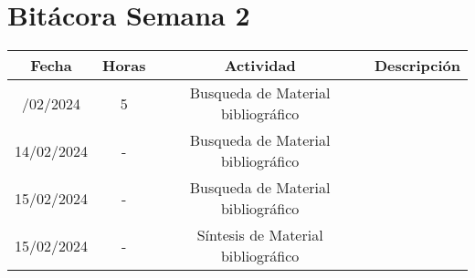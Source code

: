 \documentclass{article}
\begin{document}
\newpage
\section*{Bitácora Semana 2}

\begin{longtable}[c]{|c|c|c|p{6cm}|}
    \hline
    \textbf{Fecha} & \textbf{Horas} & \textbf{Actividad} & \textbf{Descripción} \\
    \hline
    \endhead
    \hline
    \endfoot
    13/02/2024 & 5 & Busqueda de Material bibliográfico &  \\
    14/02/2024 & - & Busqueda de Material bibliográfico & \\
    15/02/2024 & - & Busqueda de Material bibliográfico &  \\
    15/02/2024 & - & Síntesis de Material bibliográfico &  \\
    \hline
    \end{longtable}
    
    
    
\end{document}
